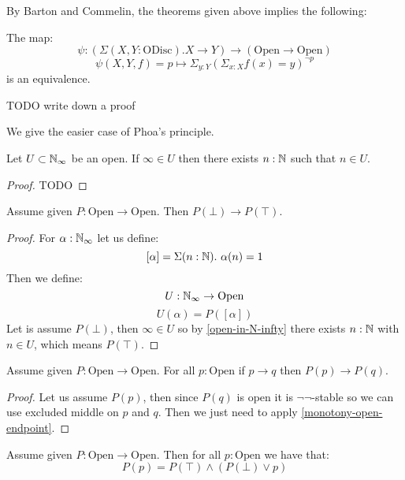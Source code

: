 By Barton and Commelin, the theorems given above implies the following:

\begin{theorem}
The map:
\[\psi: \left(\Sigma(X,Y:\mathrm{ODisc}). X\to Y\right)  \to (\mathrm{Open}\to\mathrm{Open})\]
\[\psi(X,Y,f) = p\mapsto \Sigma_{y:Y} (\Sigma_{x:X} f(x)=y)^{\neg p}\]
is an equivalence.
\end{theorem}

TODO write down a proof

We give the easier case of Phoa's principle.

\begin{lemma}\label{open-in-N-infty}
Let $U\subset \mathbb{N}_\infty$ be an open. If $\infty\in U$ then there exists $n:\mathbb{N}$ such that $n\in U$.
\end{lemma}

\begin{proof}
TODO
\end{proof}

\begin{lemma}\label{monotony-open-endpoint}
Assume given $P:\mathrm{Open}\to\mathrm{Open}$. Then $P(\bot)\to P(\top)$.
\end{lemma}

\begin{proof}
For $\alpha:\mathbb{N}_\infty$ let us define:
\[[\alpha] = \Sigma(n:\mathbb{N}).\ \alpha(n)=1\]
Then we define:
\[U:\mathbb{N}_\infty\to\mathrm{Open}\]
\[U(\alpha) = P([\alpha])\]
Let is assume $P(\bot)$, then $\infty\in U$ so by \cref{open-in-N-infty} there exists $n:\mathbb{N}$ with $n\in U$, which means $P(\top)$.
\end{proof}

\begin{lemma}\label{monotony-open}
Assume given $P:\mathrm{Open}\to\mathrm{Open}$. For all $p:\mathrm{Open}$ if $p\to q$ then $P(p)\to P(q)$.
\end{lemma}

\begin{proof}
Let us assume $P(p)$, then since $P(q)$ is open it is $\neg\neg$-stable so we can use excluded middle on $p$ and $q$. Then we just need to apply \cref{monotony-open-endpoint}.
\end{proof}

\begin{lemma}
Assume given $P:\mathrm{Open}\to\mathrm{Open}$. Then for all $p:\mathrm{Open}$ we have that:
\[P(p) = P(\top)\land(P(\bot)\lor p)\]
\end{lemma}

